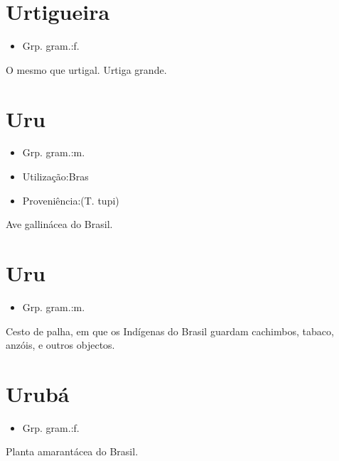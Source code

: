 \documentclass{article}
\begin{document}
\section{Urtigueira}
\begin{itemize}
\item {Grp. gram.:f.}
\end{itemize}
O mesmo que \textunderscore urtigal\textunderscore .
Urtiga grande.
\section{Uru}
\begin{itemize}
\item {Grp. gram.:m.}
\end{itemize}
\begin{itemize}
\item {Utilização:Bras}
\end{itemize}
\begin{itemize}
\item {Proveniência:(T. tupi)}
\end{itemize}
Ave gallinácea do Brasil.
\section{Uru}
\begin{itemize}
\item {Grp. gram.:m.}
\end{itemize}
Cesto de palha, em que os Indígenas do Brasil guardam cachimbos, tabaco, anzóis, e outros objectos.
\section{Urubá}
\begin{itemize}
\item {Grp. gram.:f.}
\end{itemize}
Planta amarantácea do Brasil.
\end{document}
